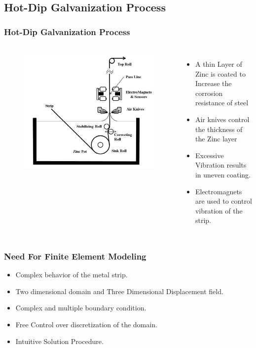\documentclass[9pt]{beamer}
\begin{document}
\subsection{Hot-Dip Galvanization Process}
\begin{frame}
\frametitle{Hot-Dip Galvanization Process}
\begin{columns}

\begin{figure}[h!]
  \includegraphics[width=1\linewidth,trim={0 0 0 1cm},clip]{hotdip.png}
\end{figure}
\begin{itemize}
\item A thin Layer of Zinc is coated to Increase the corrosion resistance of steel
\item Air knives control the thickness of the Zinc layer
\item Excessive Vibration results in uneven coating.
\item Electromagnets are used to control vibration of the strip. 
\end{itemize}
\end{columns}
\end{frame}




\begin{frame}
\frametitle{Need For Finite Element Modeling}

\begin{itemize}
\item Complex behavior of the metal strip.
\item Two dimensional domain and Three Dimensional Displacement field.
\item Complex and multiple boundary condition.
\item Free Control over discretization of the domain.
\item Intuitive Solution Procedure.
\end{itemize}

\end{frame}
\end{document}
